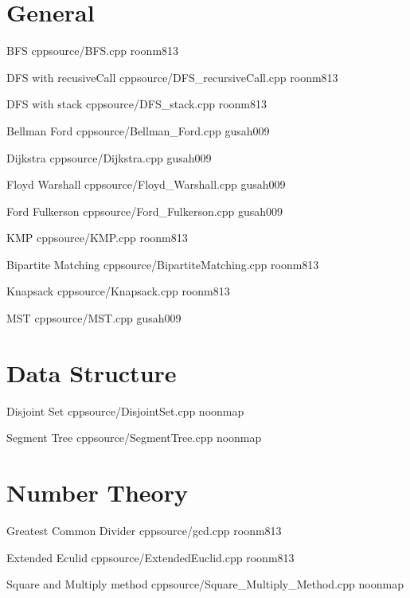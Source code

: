 \documentclass[landscape, 10pt, a4paper, oneside, twocolumn]{extarticle}
\begin{document}
\maketitlepage



\section{General}

\Algorithm
{BFS}
{}
{}
{cpp}{source/BFS.cpp}
{roonm813}

\Algorithm
{DFS with recusiveCall}
{}
{}
{cpp}{source/DFS_recursiveCall.cpp}
{roonm813}

\Algorithm
{DFS with stack}
{}
{}
{cpp}{source/DFS_stack.cpp}
{roonm813}

\Algorithm
{Bellman Ford}
{}
{}
{cpp}{source/Bellman_Ford.cpp}
{gusah009}

\Algorithm
{Dijkstra}
{}
{}
{cpp}{source/Dijkstra.cpp}
{gusah009}

\Algorithm
{Floyd Warshall}
{}
{}
{cpp}{source/Floyd_Warshall.cpp}
{gusah009}

\Algorithm
{Ford Fulkerson}
{}
{}
{cpp}{source/Ford_Fulkerson.cpp}
{gusah009}

\Algorithm
{KMP}
{}
{}
{cpp}{source/KMP.cpp}
{roonm813}


\Algorithm
{Bipartite Matching}
{}
{}
{cpp}{source/BipartiteMatching.cpp}
{roonm813}

\Algorithm
{Knapsack}
{}
{}
{cpp}{source/Knapsack.cpp}
{roonm813}

\Algorithm
{MST}
{}
{}
{cpp}{source/MST.cpp}
{gusah009}

\section{Data Structure}

\Algorithm
{Disjoint Set}
{}
{}
{cpp}{source/DisjointSet.cpp}
{noonmap}

\Algorithm
{Segment Tree}
{}
{}
{cpp}{source/SegmentTree.cpp}
{noonmap}


\section{Number Theory}

\Algorithm
{Greatest Common Divider}
{}
{}
{cpp}{source/gcd.cpp}
{roonm813}


\Algorithm
{Extended Eculid}
{}
{}
{cpp}{source/ExtendedEuclid.cpp}
{roonm813}

\Algorithm
{Square and Multiply method}
{}
{}
{cpp}{source/Square_Multiply_Method.cpp}
{noonmap}
\end{document}
